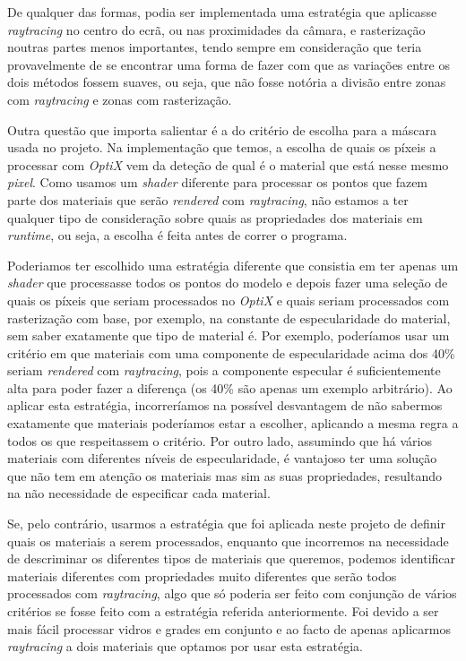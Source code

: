 \documentclass[10pt]{article}
\begin{document}
De qualquer das formas, podia ser implementada uma estratégia que aplicasse \textit{raytracing} no centro do ecrã, ou nas proximidades da câmara, e rasterização noutras partes menos importantes, tendo sempre em consideração que teria provavelmente de se encontrar uma forma de fazer com que as variações entre os dois métodos fossem suaves, ou seja, que não fosse notória a divisão entre zonas com \textit{raytracing} e zonas com rasterização.

Outra questão que importa salientar é a do critério de escolha para a máscara usada no projeto. Na implementação que temos, a escolha de quais os píxeis a processar com \textit{OptiX} vem da deteção de qual é o material que está nesse mesmo \textit{pixel}. Como usamos um \textit{shader} diferente para processar os pontos que fazem parte dos materiais que serão \textit{rendered} com \textit{raytracing}, não estamos a ter qualquer tipo de consideração sobre quais as propriedades dos materiais em \textit{runtime}, ou seja, a escolha é feita antes de correr o programa.

Poderiamos ter escolhido uma estratégia diferente que consistia em ter apenas um \textit{shader} que processasse todos os pontos do modelo e depois fazer uma seleção de quais os píxeis que seriam processados no \textit{OptiX} e quais seriam processados com rasterização com base, por exemplo, na constante de especularidade do material, sem saber exatamente que tipo de material é. Por exemplo, poderíamos usar um critério em que materiais com uma componente de especularidade acima dos 40\% seriam \textit{rendered} com \textit{raytracing}, pois a componente especular é suficientemente alta para poder fazer a diferença (os 40\% são apenas um exemplo arbitrário). Ao aplicar esta estratégia, incorreríamos na possível desvantagem de não sabermos exatamente que materiais poderíamos estar a escolher, aplicando a mesma regra a todos os que respeitassem o critério. Por outro lado, assumindo que há vários materiais com diferentes níveis de especularidade, é vantajoso ter uma solução que não tem em atenção os materiais mas sim as suas propriedades, resultando na não necessidade de especificar cada material.

Se, pelo contrário, usarmos a estratégia que foi aplicada neste projeto de definir quais os materiais a serem processados, enquanto que incorremos na necessidade de descriminar os diferentes tipos de materiais que queremos, podemos identificar materiais diferentes com propriedades muito diferentes que serão todos processados com \textit{raytracing}, algo que só poderia ser feito com conjunção de vários critérios se fosse feito com a estratégia referida anteriormente. Foi devido a ser mais fácil processar vidros e grades em conjunto e ao facto de apenas aplicarmos \textit{raytracing} a dois materiais que optamos por usar esta estratégia.
\end{document}
